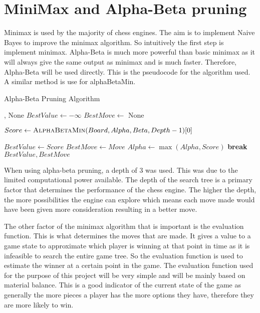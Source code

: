 \section{MiniMax and Alpha-Beta pruning}
Minimax is used by the majority of chess engines. The aim is to implement Naive Bayes to improve the minimax algorithm. So intuitively the first step is implement minimax. Alpha-Beta is much more powerful than basic minimax as it will always give the same output as minimax and is much faster. Therefore, Alpha-Beta will be used directly. This is the pseudocode for the algorithm used. A similar method is use for alphaBetaMin.
\begin{algorithm}[h]
    \caption{Alpha-Beta Pruning Algorithm}
    \begin{algorithmic}
            \State \Return {}, None
        \EndIf
        \State $BestValue \gets -\infty$
        \State $BestMove \gets$ None

            \State {}
            \State $Score \gets \textsc{AlphaBetaMin}(Board, Alpha, Beta, Depth - 1)[0]$
            
                \State $BestValue \gets Score$
                \State $BestMove \gets Move$
                \State $Alpha \gets \max(Alpha, Score)$
            \EndIf
                \State \textbf{break}
            \EndIf
        \EndFor
        \State \Return $BestValue, BestMove$
        \EndFunction
    \end{algorithmic}
\end{algorithm}

When using alpha-beta pruning, a depth of 3 was used. This was due to the limited computational power available. The depth of the search tree is a primary factor that determines the performance of the chess engine. The higher the depth, the more possibilities the engine can explore which means each move made would have been given more consideration resulting in a better move.

The other factor of the minimax algorithm that is important is the evaluation function. This is what determines the moves that are made. It gives a value to a game state to approximate which player is winning at that point in time as it is infeasible to search the entire game tree. So the evaluation function is used to estimate the winner at a certain point in the game. The evaluation function used for the purpose of this project will be very simple and will be mainly based on material balance. This is a good indicator of the current state of the game as generally the more pieces a player has the more options they have, therefore they are more likely to win.


